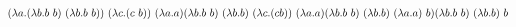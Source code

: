 \documentclass{article}
\begin{document}
\noindent
$\noindent (\lambda a.(\lambda b.b\ b)\ (\lambda b.b\ b))\ (\lambda c.(c\ b))\ (\lambda a.a) \newline
(\lambda b.b\ b)\ (\lambda b.b)\ (\lambda c.(c b))\ (\lambda a.a) \newline
(\lambda b.b\ b)\ (\lambda b.b)\ (\lambda a.a)\ b) \newline
(\lambda b.b\ b)\ (\lambda b.b)\ b$
\end{document}
